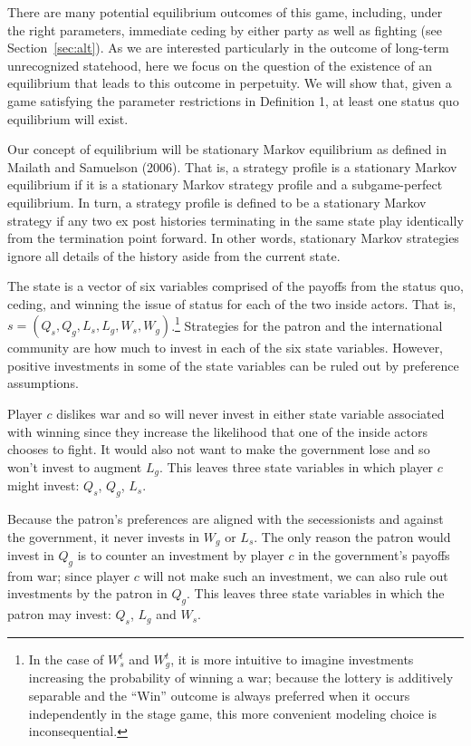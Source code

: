 \documentclass[11pt,letterpaper, notitlepage]{article}
\begin{document}
There are many potential equilibrium outcomes of this game, including, under the right parameters, immediate ceding by either party as well as fighting (see Section~\ref{sec:alt}). As we are interested particularly in the outcome of long-term unrecognized statehood, here we focus on the question of the existence of an equilibrium that leads to this outcome in perpetuity. We will show that, given a game satisfying the parameter restrictions in Definition 1, at least one status quo equilibrium will exist.

Our concept of equilibrium will be stationary Markov equilibrium as defined in Mailath and Samuelson (2006). That is, a strategy profile is a stationary Markov equilibrium if it is a stationary Markov strategy profile and a subgame-perfect equilibrium. In turn, a strategy profile is defined to be a stationary Markov strategy if any two ex post histories terminating in the same state play identically from the termination point forward. In other words, stationary Markov strategies ignore all details of the history aside from the current state.

The state is a vector of six variables comprised of the payoffs from the status quo, ceding, and winning the issue of status for each of the two inside actors. That is, $s = \left(Q_s,Q_g,L_s,L_g,W_s,W_g \right)$.\footnote{In the case of $W_s^t$ and $W_g^t$, it is more intuitive to imagine investments increasing the probability of winning a war; because the lottery is additively separable and the ``Win'' outcome is always preferred when it occurs independently in the stage game, this more convenient modeling choice is inconsequential.} Strategies for the patron and the international community are how much to invest in each of the six state variables. However, positive investments in some of the state variables can be ruled out by preference assumptions.

Player $c$ dislikes war and so will never invest in either state variable associated with winning since they increase the likelihood that one of the inside actors chooses to fight. It would also not want to make the government lose and so won't invest to augment $L_g$. This leaves three state variables in which player $c$ might invest: $Q_s$, $Q_g$, $L_s$.

Because the patron's preferences are aligned with the secessionists and against the government, it never invests in $W_g$ or $L_s$. The only reason the patron would invest in $Q_g$ is to counter an investment by player $c$ in the government's payoffs from war; since player $c$ will not make such an investment, we can also rule out investments by the patron in $Q_g$. This leaves three state variables in which the patron may invest: $Q_s$, $L_g$ and $W_s$.
\end{document}
